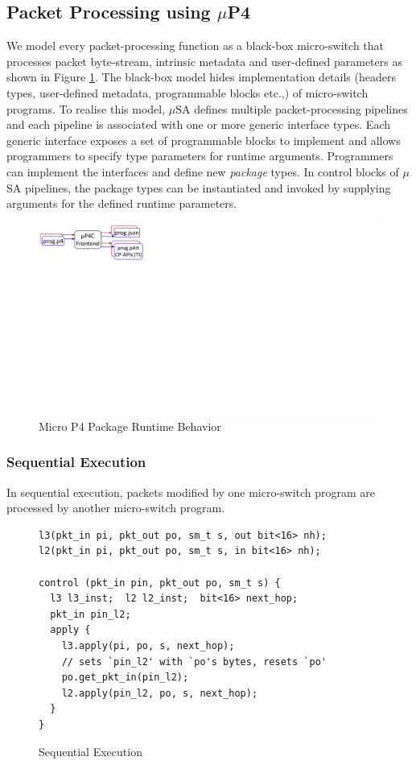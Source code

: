\subsection{Packet Processing using $\mu$P4}
\label{subsection:packet-processing-using-mp4}
We model every packet-processing function as a black-box micro-switch that processes packet byte-stream, intrinsic metadata and user-defined parameters as shown in Figure \ref{fig:package-runtime-behavior}.
The black-box model hides implementation details (headers types, user-defined metadata, programmable blocks etc.,) of micro-switch programs.
To realise this model, $\mu$SA defines multiple packet-processing pipelines and each pipeline is associated with one or more generic interface types.
Each generic interface exposes a set of programmable blocks to implement and allows programmers to specify type parameters for runtime arguments.
Programmers can implement the interfaces and define new \emph{package} types.
In control blocks of $\mu$SA pipelines, the package types can be instantiated and invoked by supplying arguments for the defined runtime parameters. 
\begin{figure}[!h]
    \centering
    \includegraphics[trim=300 300 0 0, clip,scale=0.2]{mp4c-frontend}
    \caption{Micro P4 Package Runtime Behavior}
    \label{fig:package-runtime-behavior}
\end{figure}


\subsubsection{Sequential Execution}
In sequential execution, packets modified by one micro-switch program are processed by another micro-switch program.


\begin{figure}[ht]
\begin{lstlisting}[frame=none]
l3(pkt_in pi, pkt_out po, sm_t s, out bit<16> nh);
l2(pkt_in pi, pkt_out po, sm_t s, in bit<16> nh);

control (pkt_in pin, pkt_out po, sm_t s) {
  l3 l3_inst;  l2 l2_inst;  bit<16> next_hop;
  pkt_in pin_l2;
  apply {
    l3.apply(pi, po, s, next_hop);
    // sets `pin_l2' with `po's bytes, resets `po'
    po.get_pkt_in(pin_l2);
    l2.apply(pin_l2, po, s, next_hop);
  }
}
\end{lstlisting}
\caption{Sequential Execution}
\label{fig:sequential-execution}
\end{figure}

